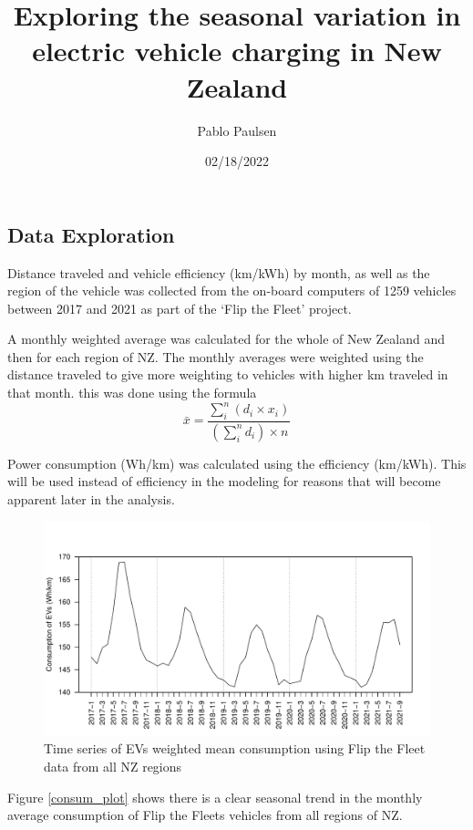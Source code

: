 \documentclass[
]{article}
\title{Exploring the seasonal variation in electric vehicle charging in
New Zealand}
\author{Pablo Paulsen}
\date{02/18/2022}
\begin{document}
\maketitle

\hypertarget{data-exploration}{%
\subsection{Data Exploration}\label{data-exploration}}

Distance traveled and vehicle efficiency (km/kWh) by month, as well as
the region of the vehicle was collected from the on-board computers of
1259 vehicles between 2017 and 2021 as part of the `Flip the Fleet'
project.

A monthly weighted average was calculated for the whole of New Zealand
and then for each region of NZ. The monthly averages were weighted using
the distance traveled to give more weighting to vehicles with higher km
traveled in that month. this was done using the formula
\[\bar{x} = \frac{\sum_{i}^{n} (d_i\times x_i)}{\left(\sum_{i}^{n} d_i\right)\times n}\]

Power consumption (Wh/km) was calculated using the efficiency (km/kWh).
This will be used instead of efficiency in the modeling for reasons that
will become apparent later in the analysis.

\begin{figure}
\centering
\includegraphics{final_report_files/figure-latex/consum_plot-1.pdf}
\caption{Time series of EVs weighted mean consumption using Flip the
Fleet data from all NZ regions\label{fig:consum_plot}}
\end{figure}

Figure \ref{consum_plot} shows there is a clear seasonal trend in the
monthly average consumption of Flip the Fleets vehicles from all regions
of NZ.
\end{document}
